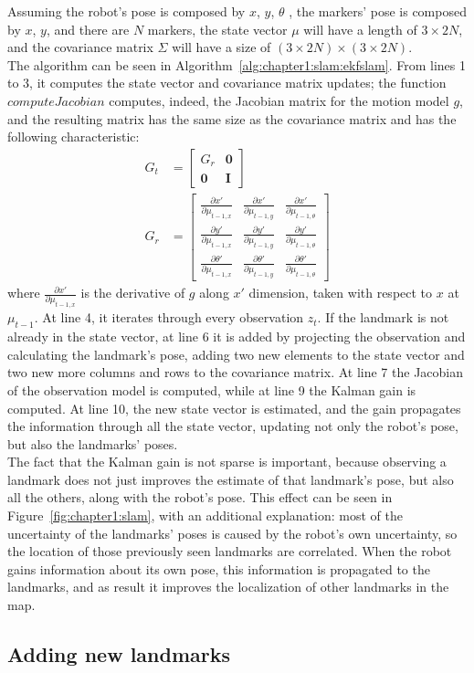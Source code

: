 Assuming the robot's pose is composed by $x$, $y$, $\theta$ , the markers' pose is composed by $x$, $y$, and there are $N$ markers, the state vector $\mu$ will have a length of $3 \times 2N$, and the covariance matrix $\Sigma$ will have a size of $(3 \times 2N) \times (3 \times 2N)$.\\

The algorithm can be seen in Algorithm~\ref{alg:chapter1:slam:ekfslam}. From lines 1 to 3, it computes the state vector and covariance matrix updates; the function $computeJacobian$ computes, indeed, the Jacobian matrix for the motion model $g$, and the resulting matrix has the same size as the covariance matrix and has the following characteristic:
\begin{align}
   G_t &= \begin{bmatrix}
        G_r & \textbf{0} \\
        \textbf{0} & \textbf{I}
    \end{bmatrix}\\
    G_r &= \begin{bmatrix}
    \frac{\partial x'}{\partial \mu_{t-1,x}} & \frac{\partial x'}{\partial \mu_{t-1,y}} & \frac{\partial x'}{\partial \mu_{t-1,\theta}}\\
    \frac{\partial y'}{\partial \mu_{t-1,x}} & \frac{\partial y'}{\partial \mu_{t-1,y}} & \frac{\partial y'}{\partial \mu_{t-1,\theta}}\\
    \frac{\partial \theta'}{\partial \mu_{t-1,x}} & \frac{\partial \theta'}{\partial \mu_{t-1,y}} & \frac{\partial \theta'}{\partial \mu_{t-1,\theta}}
\end{bmatrix}
\end{align}
where $\frac{\partial x'}{\partial \mu_{t-1,x}}$ is the derivative of $g$ along $x'$ dimension, taken with respect to $x$ at $\mu_{t-1}$. At line 4, it iterates through every observation $z_t$. If the landmark is not already in the state vector, at line 6 it is added by projecting the observation and calculating the landmark's pose, adding two new elements to the state vector and two new more columns and rows to the covariance matrix. At line 7 the Jacobian of the observation model is computed, while at line 9 the Kalman gain is computed. At line 10, the new state vector is estimated, and the gain propagates the information through all the state vector, updating not only the robot's pose, but also the landmarks' poses. \\

The fact that the Kalman gain is not sparse is important, because observing a landmark does not just improves the estimate of that landmark's pose, but also all the others, along with the robot's pose. This effect can be seen in Figure~\ref{fig:chapter1:slam}, with an additional explanation: most of the uncertainty of the landmarks' poses is caused by the robot's own uncertainty, so the location of those previously seen landmarks are correlated. When the robot gains information about its own pose, this information is propagated to the landmarks, and as result it improves the localization of other landmarks in the map.

\subsection{Adding new landmarks}
